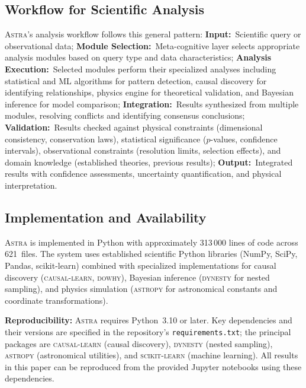 \documentclass[fleqn,usenatbib]{mnras}
\newcommand{\astra}{\textsc{Astra}\xspace}
\begin{document}
\subsection{Workflow for Scientific Analysis}
\label{sec:methods:workflow}

\astra's analysis workflow follows this general pattern:
\textbf{Input:}~Scientific query or observational data;
\textbf{Module Selection:}~Meta-cognitive layer selects appropriate analysis modules based on query type and data characteristics;
\textbf{Analysis Execution:}~Selected modules perform their specialized analyses including statistical and ML algorithms for pattern detection, causal discovery for identifying relationships, physics engine for theoretical validation, and Bayesian inference for model comparison;
\textbf{Integration:}~Results synthesized from multiple modules, resolving conflicts and identifying consensus conclusions;
\textbf{Validation:}~Results checked against physical constraints (dimensional consistency, conservation laws), statistical significance ($p$-values, confidence intervals), observational constraints (resolution limits, selection effects), and domain knowledge (established theories, previous results);
\textbf{Output:}~Integrated results with confidence assessments, uncertainty quantification, and physical interpretation.

\subsection{Implementation and Availability}
\label{sec:methods:implementation}

\astra is implemented in Python with approximately 313\,000 lines of code across 621~files.
The system uses established scientific Python libraries (NumPy, SciPy, Pandas, scikit-learn) combined with specialized implementations for causal discovery (\textsc{causal-learn}, \textsc{dowhy}), Bayesian inference (\textsc{dynesty} for nested sampling), and physics simulation (\textsc{astropy} for astronomical constants and coordinate transformations).

\textbf{Reproducibility:}
\astra requires Python~3.10 or later.
Key dependencies and their versions are specified in the repository's \texttt{requirements.txt}; the principal packages are \textsc{causal-learn} (causal discovery), \textsc{dynesty} (nested sampling), \textsc{astropy} (astronomical utilities), and \textsc{scikit-learn} (machine learning).
All results in this paper can be reproduced from the provided Jupyter notebooks using these dependencies.
\end{document}
